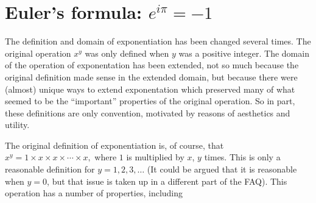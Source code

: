 \section{Euler's formula: $e^{i \pi} = - 1 $}

The definition and domain of exponentiation has been changed several
times.  The original operation $x^y$ was only defined when $y$ was a
positive integer.  The domain of the operation of exponentation has been
extended, not so much because the original definition made sense in the
extended domain, but because there were (almost) unique ways to extend
exponentation which preserved many of what seemed to be the
``important'' properties of the original operation.  So in part, these
definitions are only convention, motivated by reasons of aesthetics and
utility.

The original definition of exponentiation is, of course, that $x^y = 1
\times x \times x \times \cdots \times x,$ where $1$ is multiplied by
$x$, $y$ times.  This is only a reasonable definition for $y=1, 2, 3,
\dots$ (It could be argued that it is reasonable when $y=0$, but that
issue is taken up in a different part of the FAQ).  This operation has a
number of properties, including

